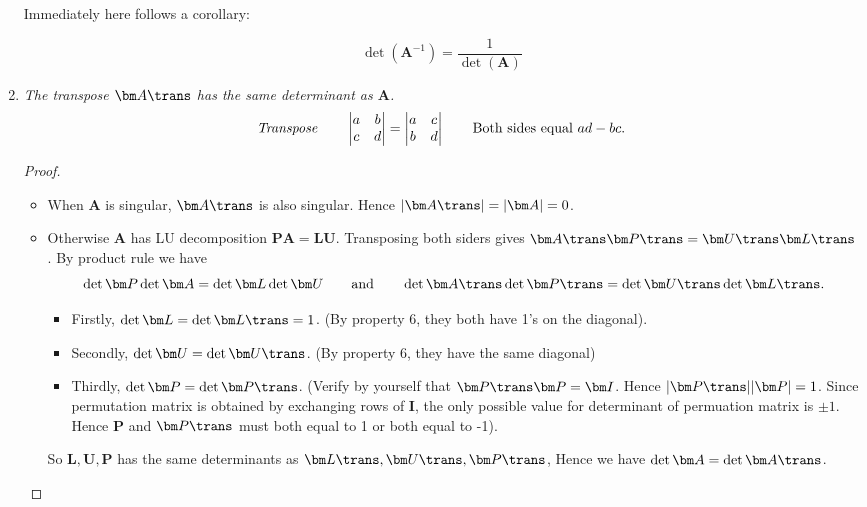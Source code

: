 \begin{enumerate}
Immediately here follows a corollary:
\begin{corollary}
\[\det(\bm A^{-1})=\frac{1}{\det(\bm A)}\]
\end{corollary}
\item
\emph{The transpose $\bm A\trans$ has the same determinant as $\bm A$.}
\begin{gather*}
\text{\emph{Transpose}}\qquad\begin{vmatrix}a&b\\c&d\end{vmatrix}=\begin{vmatrix}a&c\\b&d\end{vmatrix}\qquad\text{Both sides equal $ad-bc$}.
\end{gather*}
\begin{proof}
\begin{itemize}
\item
When $\bm A$ is singular, $\bm A\trans$ is also singular. Hence $|\bm A\trans|=|\bm A|=0$.
\item
Otherwise $\bm A$ has LU decomposition $\bm{PA}=\bm{LU}$. Transposing both siders gives $\bm A\trans\bm P\trans=\bm U\trans\bm L\trans$. By product rule we have
\[
\det\bm P\det\bm A=\det\bm L\det\bm U\qquad\text{and}\qquad\det\bm A\trans\det\bm P\trans=\det\bm U\trans\det\bm L\trans.
\]
\begin{itemize}
\item
Firstly, $\det\bm L=\det\bm L\trans=1$. (By property 6, they both have 1's on the diagonal).
\item
Secondly, $\det\bm U=\det\bm U\trans$. (By property 6, they have the same diagonal)
\item
Thirdly, $\det\bm P=\det\bm P\trans$. (Verify by yourself that $\bm P\trans\bm P=\bm I$. Hence $|\bm P\trans||\bm P|=1$. Since permutation matrix is obtained by exchanging rows of $\bm I$, the only possible value for determinant of permuation matrix is $\pm 1$. Hence $\bm P$ and $\bm P\trans$ must both equal to 1 or both equal to -1).
\end{itemize}
So $\bm{L,U,P}$ has the same determinants as $\bm L\trans,\bm U\trans,\bm P\trans$, Hence we have $\det\bm A=\det\bm A\trans$.
\end{itemize}
\end{proof}
\end{enumerate}












